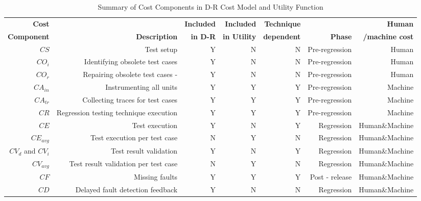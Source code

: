 \begin{table}[htbp]
\begin{small}
  \centering
  \caption{Summary of Cost Components in D-R Cost Model and Utility
 Function}
    \begin{tabular}{rrrrrrr}
    \textbf{Cost} &    & \textbf{Included}
    & \textbf{Included} & \textbf{Technique} &
     & \textbf{Human} \\
    \textbf{Component} & \textbf{Description} & \textbf{in D-R}
    & \textbf{in Utility} & \textbf{dependent} &
    \textbf{Phase} & \textbf{/machine cost} \\
    
    $CS$ & Test setup & Y & N & N &Pre-regression & Human \\
    $CO_i$ & Identifying obsolete test cases & Y     & N     & N     &
    Pre-regression & Human \\
    $CO_r$ & Repairing obsolete test cases  - & Y     & N     & N     &
    Pre-regression & Human \\
    $CA_{in}$ & Instrumenting all units & Y     & Y     & Y     & Pre-regression
    & Machine \\
    $CA_{tr}$ & Collecting traces for test cases  & Y     & Y   & Y     &
    Pre-regression& Machine \\
    $CR$ & Regression testing technique execution & Y     & Y     & Y    &  Pre-regression & Machine \\
    $CE$ & Test execution & Y     & N     & Y     &   Regression & Human\&Machine \\
    $CE_{avg}$& Test execution per test case & N     & Y     & N   & Regression & Human\&Machine \\
    $CV_d$ and $CV_i$ & Test result validation& Y     & N     & Y     & Regression & Human\&Machine \\
    $CV_{avg}$ & Test result validation per test case & N     & Y     & N     & Regression& Human\&Machine \\
    $CF$ & Missing faults & Y     & Y     & Y     & Post - release  &    Human\&Machine \\
    $CD$ & Delayed fault detection feedback& Y     & N     & N     & Regression & Human\&Machine \\
    \end{tabular}%

\end{small}
\label{tab:Summary_of_Cost_Components} 
\end{table}%
